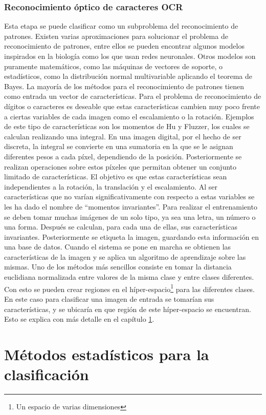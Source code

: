 \documentclass[a4paper, 11pt, oneside]{report}
\begin{document}
\subsection{Reconocimiento óptico de caracteres OCR}
Esta etapa se puede clasificar como un subproblema del reconocimiento de patrones. Existen varias aproximaciones para solucionar el problema de reconocimiento de patrones, entre ellos se pueden encontrar algunos modelos inspirados en la biología como los que usan redes neuronales. Otros modelos son puramente matemáticos, como las máquinas de vectores de soporte, o estadísticos, como la distribución normal multivariable aplicando el teorema de Bayes.
La mayoría de los métodos para el reconocimiento de patrones tienen como entrada un vector de características. Para el problema de reconocimiento de dígitos o caracteres es deseable que estas características cambien muy poco frente a ciertas variables de cada imagen como el escalamiento o la rotación. Ejemplos de este tipo de características son los momentos de Hu y Fluzzer, los cuales se calculan realizando una integral. En una imagen digital, por el hecho de ser discreta, la integral se convierte en una sumatoria en la que se le asignan diferentes pesos a cada píxel, dependiendo de la posición. Posteriormente se realizan operaciones sobre estos píxeles que permitan obtener un conjunto limitado de características. El objetivo es que estas características sean independientes a la rotación, la translación y el escalamiento. Al ser características que no varían significativamente con respecto a estas variables se les ha dado el nombre de ``momentos invariantes''.
Para realizar el entrenamiento se deben tomar muchas imágenes de un solo tipo, ya sea una letra, un número o una forma. Después se calculan, para cada una de ellas, sus características invariantes. Posteriormente se etiqueta la imagen, guardando esta información en una base de datos. Cuando el sistema se pone en marcha se obtienen las características de la imagen y se aplica un algoritmo de aprendizaje sobre las mismas. Uno de los métodos más sencillos consiste en tomar la distancia euclidiana normalizada entre valores de la misma clase y entre clases diferentes. Con esto se pueden crear regiones en el híper-espacio\footnote{Un espacio de varias dimensiones} para las diferentes clases. En este caso para clasificar una imagen de entrada se tomarían sus características, y se ubicaría en que región de este híper-espacio se encuentran. Esto se explica con más detalle en el capítulo \ref{chap:ml}.
\chapter{Métodos estadísticos para la clasificación}
\label{chap:ml}
\end{document}
